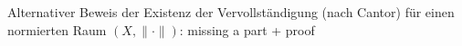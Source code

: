 \begin{bemerkung}
Alternativer Beweis der Existenz der Vervollständigung (nach Cantor) für einen normierten Raum $(X, \| \cdot \|)$:
	missing a part + proof %
\end{bemerkung}


\newpage






























